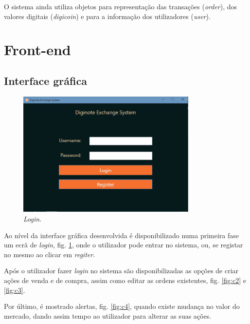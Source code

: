 \documentclass[12pt]{article}
\begin{document}
O sistema ainda utiliza objetos para representação das transações (\textit{order}), dos valores digitais (\textit{digicoin}) e para a informação dos utilizadores (\textit{user}).


\section{Front-end}

\subsection{Interface gráfica}

\begin{figure}[H]
    \centering
    \includegraphics[width=0.8\textwidth]{1.png}
    \caption{\textit{Login.}}
    \label{fig:c1}
\end{figure}

Ao nível da interface gráfica desenvolvida é disponibilizado numa primeira fase um ecrã de \textit{login}, fig. \ref{fig:c1}, onde o utilizador pode entrar no sistema, ou, se registar no mesmo ao clicar em \textit{regiter}.

Após o utilizador fazer \textit{login} no sistema são disponibilizadas as opções de criar ações de venda e de compra, assim como editar as ordens existentes, fig. \ref{fig:c2} e \ref{fig:c3}.

Por último, é mostrado alertas, fig. \ref{fig:c4}, quando existe mudança no valor do mercado, dando assim tempo ao utilizador para alterar as suas ações.
\end{document}
